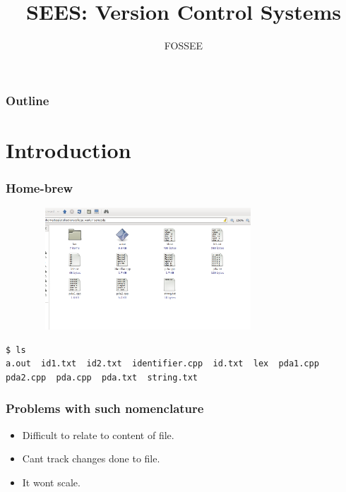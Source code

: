 \documentclass[14pt,compress]{beamer}
\title[Version Control Systems]{SEES: Version Control Systems}
\author[FOSSEE] {FOSSEE}
\institute[IIT Bombay] {Department of Aerospace Engineering\\IIT Bombay}
\date[]{}
\begin{document}
\begin{frame}
  \maketitle
\end{frame}

\begin{frame}
  \frametitle{Outline}
  \tableofcontents
\end{frame}


\section{Introduction}

\begin{frame}[fragile]
  \frametitle{Home-brew}
  \begin{center}
    \includegraphics[height=1.8in,width=4.2in]{folder.png}
  \end{center}
  \begin{lstlisting}
$ ls
a.out  id1.txt  id2.txt  identifier.cpp  id.txt  lex  pda1.cpp  pda2.cpp  pda.cpp  pda.txt  string.txt
  \end{lstlisting} %
\end{frame}

\begin{frame}[fragile]
  \frametitle{Problems with such nomenclature}  
  \begin{block}{}    
  \begin{itemize}
  \item Difficult to relate to content of file.
  \item Cant track changes done to file.
  \item It wont scale.
  \end{itemize}
    \end{block}
\end{frame}
\end{document}
